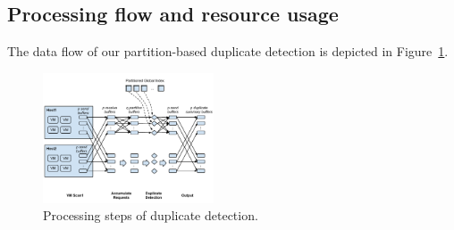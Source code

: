 \subsection{Processing flow and resource usage}

The data flow of our partition-based  duplicate detection is depicted in
Figure~\ref{fig:flow}. 
\begin{figure}
\centering
\includegraphics[width=0.45\textwidth]{steps.pdf}
\caption{ Processing steps of duplicate detection.}
\label{fig:flow}
\end{figure}

